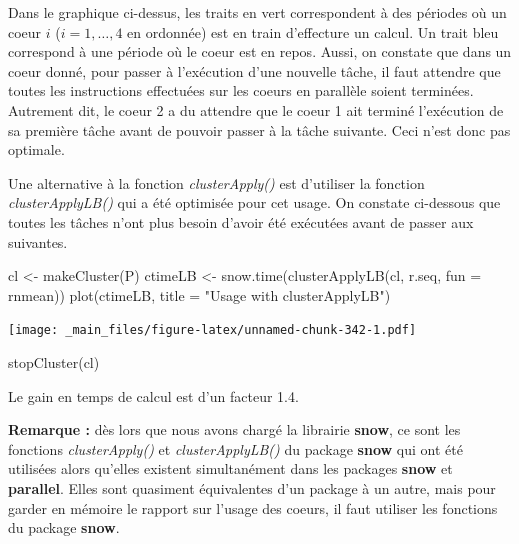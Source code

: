 \documentclass[
]{book}
\newenvironment{Shaded}{\begin{snugshade}}{\end{snugshade}}
\newcommand{\AttributeTok}[1]{\textcolor[rgb]{0.77,0.63,0.00}{#1}}
\newcommand{\FunctionTok}[1]{\textcolor[rgb]{0.00,0.00,0.00}{#1}}
\newcommand{\NormalTok}[1]{#1}
\newcommand{\OtherTok}[1]{\textcolor[rgb]{0.56,0.35,0.01}{#1}}
\newcommand{\StringTok}[1]{\textcolor[rgb]{0.31,0.60,0.02}{#1}}
\theoremstyle{definition}
\theoremstyle{definition}
\theoremstyle{definition}
\theoremstyle{definition}
\theoremstyle{remark}
\begin{document}
Dans le graphique ci-dessus, les traits en vert correspondent à des périodes où un coeur \(i\) (\(i = 1, \ldots, 4\) en ordonnée) est en train d'effecture un calcul. Un trait bleu correspond à une période où le coeur est en repos. Aussi, on constate que dans un coeur donné, pour passer à l'exécution d'une nouvelle tâche, il faut attendre que toutes les instructions effectuées sur les coeurs en parallèle soient terminées. Autrement dit, le coeur 2 a du attendre que le coeur 1 ait terminé l'exécution de sa première tâche avant de pouvoir passer à la tâche suivante. Ceci n'est donc pas optimale.

Une alternative à la fonction \emph{clusterApply()} est d'utiliser la fonction \emph{clusterApplyLB()} qui a été optimisée pour cet usage. On constate ci-dessous que toutes les tâches n'ont plus besoin d'avoir été exécutées avant de passer aux suivantes.

\begin{Shaded}
\begin{Highlighting}[]
\NormalTok{cl }\OtherTok{\textless{}{-}} \FunctionTok{makeCluster}\NormalTok{(P) }
\NormalTok{ctimeLB }\OtherTok{\textless{}{-}} \FunctionTok{snow.time}\NormalTok{(}\FunctionTok{clusterApplyLB}\NormalTok{(cl, r.seq, }\AttributeTok{fun =}\NormalTok{ rnmean))}
\FunctionTok{plot}\NormalTok{(ctimeLB, }\AttributeTok{title =} \StringTok{"Usage with clusterApplyLB"}\NormalTok{)}
\end{Highlighting}
\end{Shaded}

\texttt{[image: \_main\_files/figure-latex/unnamed-chunk-342-1.pdf]}

\begin{Shaded}
\begin{Highlighting}[]
\FunctionTok{stopCluster}\NormalTok{(cl) }
\end{Highlighting}
\end{Shaded}

Le gain en temps de calcul est d'un facteur 1.4.

\textbf{Remarque :} dès lors que nous avons chargé la librairie \textbf{snow}, ce sont les fonctions \emph{clusterApply()} et \emph{clusterApplyLB()} du package \textbf{snow} qui ont été utilisées alors qu'elles existent simultanément dans les packages \textbf{snow} et \textbf{parallel}. Elles sont quasiment équivalentes d'un package à un autre, mais pour garder en mémoire le rapport sur l'usage des coeurs, il faut utiliser les fonctions du package \textbf{snow}.
\end{document}
